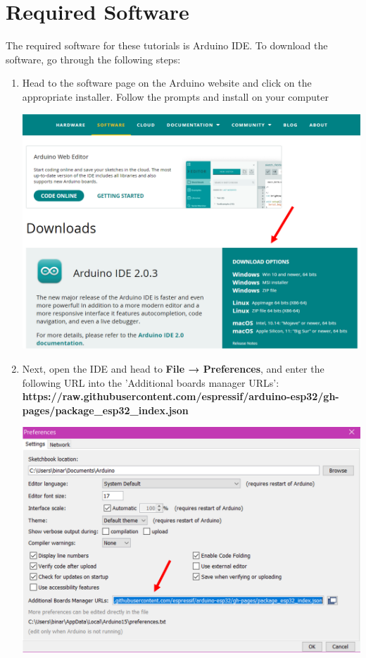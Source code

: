 \documentclass[a4paper,12pt]{report}
\newcommand{\imageWidth}{140mm}
\begin{document}
\newpage

\section*{Required Software}
The required software for these tutorials is Arduino IDE. To download the software, go through the following steps:
    \begin{enumerate}
        \item Head to the software page on the Arduino website and click on the appropriate installer. Follow the prompts and install on your computer
        
        \begin{center}
            \includegraphics[width = \imageWidth]{Assets/Downloads_page.png}
        \end{center}
        
        \item Next, open the IDE and head to \textbf{File → Preferences}, and enter the following URL into the 'Additional boards manager URLs':
        \textbf{https://raw.githubusercontent.com/espressif/arduino-esp32/gh-pages/package\_esp32\_index.json}
        
        \begin{center}
            \includegraphics[width = \imageWidth]{Assets/Esp_url.png}
        \end{center}
        

\end{enumerate}
\end{document}
